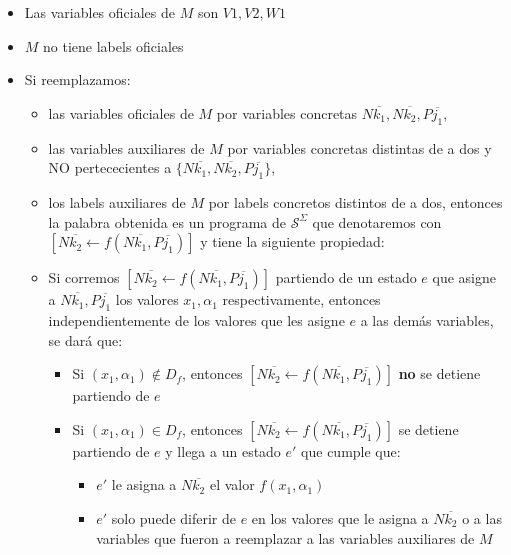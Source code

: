 \documentclass[
]{article}
\providecommand{\tightlist}{%
  \setlength{\itemsep}{0pt}\setlength{\parskip}{0pt}}
\begin{document}
\begin{itemize}
\tightlist
\item
  Las variables oficiales de \(M\) son \(V1,V2,W1\)
\item
  \(M\) no tiene labels oficiales
\item
  Si reemplazamos:

  \begin{itemize}
  \tightlist
  \item
    las variables oficiales de \(M\) por variables concretas
    \(N\overline{k_1},N\overline{k_2},P\overline{j_1}\),
  \item
    las variables auxiliares de \(M\) por variables concretas distintas
    de a dos y NO pertececientes a
    \(\{N\overline{k_1},N\overline{k_2},P\overline{j_1}\}\),
  \item
    los labels auxiliares de \(M\) por labels concretos distintos de a
    dos, entonces la palabra obtenida es un programa de
    \(\mathcal{S}^\Sigma\) que denotaremos con
    \([N\overline{k_{2}}\leftarrow f(N\overline{k_1},P\overline{j_1})]\)
    y tiene la siguiente propiedad:
  \item
    Si corremos
    \([N\overline{k_{2}}\leftarrow f(N\overline{k_1},P\overline{j_1})]\)
    partiendo de un estado \(e\) que asigne a
    \(N\overline{k_1}, P\overline{j_1}\) los valores \(x_1, \alpha_1\)
    respectivamente, entonces independientemente de los valores que les
    asigne \(e\) a las demás variables, se dará que:

    \begin{itemize}
    \tightlist
    \item
      Si \((x_1, \alpha_1)\notin D_f\), entonces
      \([N\overline{k_{2}}\leftarrow f(N\overline{k_1},P\overline{j_1})]\)
      \textbf{no} se detiene partiendo de \(e\)
    \item
      Si \((x_1, \alpha_1)\in D_f\), entonces
      \([N\overline{k_{2}}\leftarrow f(N\overline{k_1},P\overline{j_1})]\)
      se detiene partiendo de \(e\) y llega a un estado \(e'\) que
      cumple que:

      \begin{itemize}
      \tightlist
      \item
        \(e'\) le asigna a \(N\overline{k_{2}}\) el valor
        \(f(x_1, \alpha_1)\)
      \item
        \(e'\) solo puede diferir de \(e\) en los valores que le asigna
        a \(N\overline{k_{2}}\) o a las variables que fueron a
        reemplazar a las variables auxiliares de \(M\)
      \end{itemize}
    \end{itemize}
  \end{itemize}
\end{itemize}
\end{document}
